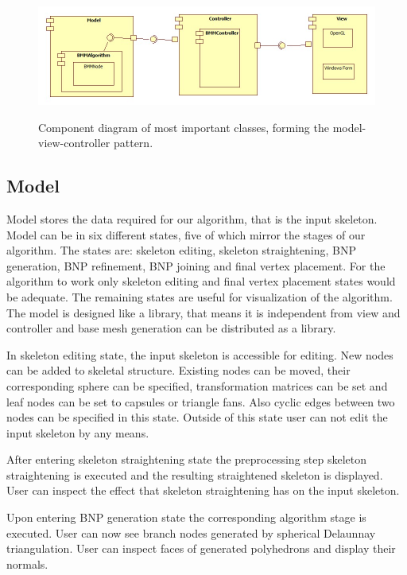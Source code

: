 \begin{figure}[h]
    \centering
    \includegraphics[width=\textwidth]{images/classes}
    \label{fig:classes}
    \caption[Component diagram of classes]{Component diagram of most important classes, forming the model-view-controller pattern.}
\end{figure}

\subsection{Model}

Model stores the data required for our algorithm, that is the input skeleton.
Model can be in six different states, five of which mirror the stages of our algorithm.
The states are: skeleton editing, skeleton straightening, BNP generation, BNP refinement, BNP joining and final vertex placement.
For the algorithm to work only skeleton editing and final vertex placement states would be adequate.
The remaining states are useful for visualization of the algorithm.
The model is designed like a library, that means it is independent from view and controller and base mesh generation can be distributed as a library.

In skeleton editing state, the input skeleton is accessible for editing.
New nodes can be added to skeletal structure.
Existing nodes can be moved, their corresponding sphere can be specified, transformation matrices can be set and leaf nodes can be set to capsules or triangle fans.
Also cyclic edges between two nodes can be specified in this state.
Outside of this state user can not edit the input skeleton by any means.

After entering skeleton straightening state the preprocessing step skeleton straightening is executed and the resulting straightened skeleton is displayed.
User can inspect the effect that skeleton straightening has on the input skeleton.

Upon entering BNP generation state the corresponding algorithm stage is executed.
User can now see branch nodes generated by spherical Delaunnay triangulation.
User can inspect faces of generated polyhedrons and display their normals.

